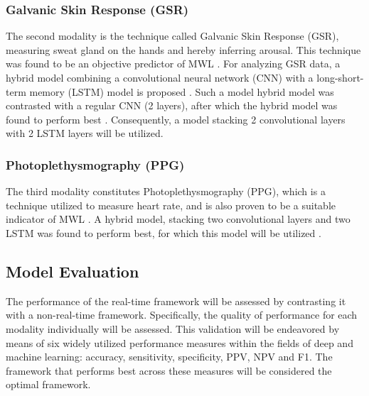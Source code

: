 \documentclass{article}
\begin{document}
\subsubsection{Galvanic Skin Response (GSR)}
The second modality is the technique called Galvanic Skin Response (GSR), measuring sweat gland on the hands and hereby inferring arousal. This technique was found to be an objective predictor of MWL \cite{shi2007galvanic}. For analyzing GSR data, a hybrid model combining a convolutional neural network (CNN) with a long-short-term memory (LSTM) model is proposed \cite{sun2019hybrid}. Such a model hybrid model was contrasted with a regular CNN (2 layers), after which the hybrid model was found to perform best \cite{dolmans2020perceived}. Consequently, a model stacking 2 convolutional layers with 2 LSTM layers will be utilized.  

\subsubsection{Photoplethysmography (PPG)}
The third modality constitutes Photoplethysmography (PPG), which is a technique utilized to measure heart rate, and is also proven to be a suitable indicator of MWL \cite{zhang2018evaluating}. A hybrid model, stacking two convolutional layers and two LSTM was found to perform best, for which this model will be utilized \cite{biswas2019cornet}.

\subsection{Model Evaluation}
The performance of the real-time framework will be assessed by contrasting it with a non-real-time framework. Specifically, the quality of performance for each modality individually will be assessed. This validation will be endeavored by means of six widely utilized performance measures within the fields of deep and machine learning: accuracy, sensitivity, specificity, PPV, NPV and F1. The framework that performs best across these measures will be considered the optimal framework. 

\newpage


\end{document}
